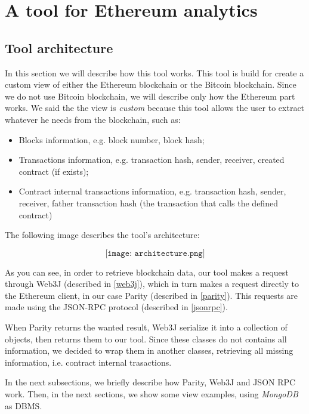 \label{Chapter3}

\chapter{A tool for Ethereum analytics}
\section{Tool architecture}
In this section we will describe how this tool works. This tool is build for create a custom view of either the Ethereum blockchain or the Bitcoin blockchain. Since we do not use Bitcoin blockchain, we will describe only how the Ethereum part works. We said the the view is \textit{custom} because this tool allows the user to extract whatever he needs from the blockchain, such as:
\begin{itemize}
    \item Blocks information, e.g. block number, block hash;
    \item Transactions information, e.g. transaction hash, sender, receiver, created contract (if exists);
    \item Contract internal transactions information, e.g. transaction hash, sender, receiver, father transaction hash (the transaction that calls the defined contract)
\end{itemize}

The following image describes the tool's architecture:
\begin{center}
    \[
        \texttt{[image: architecture.png]}
    \]
\end{center}
As you can see, in order to retrieve blockchain data, our tool makes a request through Web3J (described in \ref{web3j}), which in turn makes a request directly to the Ethereum client, in our case Parity (described in \ref{parity}). This requests are made using the JSON-RPC protocol (described in \ref{jsonrpc}). 

When Parity returns the wanted result, Web3J serialize it into a collection of objects, then returns them to our tool. Since these classes do not contains all information, we decided to wrap them in another classes, retrieving all missing information, i.e. contract internal trasactions.

In the next subsections, we briefly describe how Parity, Web3J and JSON RPC work. Then, in the next sections, we show some view examples, using \textit{MongoDB} as DBMS.

